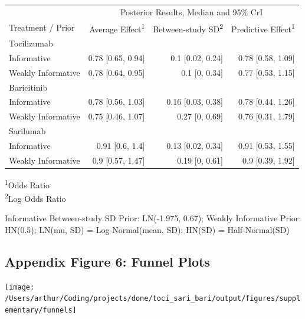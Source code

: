\documentclass[
  12pt,
]{article}
\begin{document}
\captionsetup[table]{labelformat=empty,skip=1pt}
\begin{longtable}{lrrr}
\toprule
 & \multicolumn{3}{c}{Posterior Results, Median and 95\% CrI} \\ 
 \cmidrule(lr){2-4}
Treatment / Prior & Average Effect\textsuperscript{1} & Between-study SD\textsuperscript{2} & Predictive Effect\textsuperscript{1} \\ 
\midrule
\multicolumn{1}{l}{Tocilizumab} \\ 
\midrule
Informative & 0.78 [0.65, 0.94] & 0.1 [0.02, 0.24] & 0.78 [0.58, 1.09] \\ 
Weakly Informative & 0.78 [0.64, 0.95] & 0.1 [0, 0.34] & 0.77 [0.53, 1.15] \\ 
\midrule
\multicolumn{1}{l}{Baricitinib} \\ 
\midrule
Informative & 0.78 [0.56, 1.03] & 0.16 [0.03, 0.38] & 0.78 [0.44, 1.26] \\ 
Weakly Informative & 0.75 [0.46, 1.07] & 0.27 [0, 0.69] & 0.76 [0.31, 1.79] \\ 
\midrule
\multicolumn{1}{l}{Sarilumab} \\ 
\midrule
Informative & 0.91 [0.6, 1.4] & 0.13 [0.02, 0.34] & 0.91 [0.53, 1.55] \\ 
Weakly Informative & 0.9 [0.57, 1.47] & 0.19 [0, 0.61] & 0.9 [0.39, 1.92] \\ 
 \bottomrule
\end{longtable}
\vspace{-5mm}
\begin{minipage}{\linewidth}
\textsuperscript{1}Odds Ratio \\ 
\textsuperscript{2}Log Odds Ratio \\ 
\end{minipage}
\begin{minipage}{\linewidth}
Informative Between-study SD Prior: LN(-1.975, 0.67); Weakly Informative Prior: HN(0.5); LN(mu, SD) = Log-Normal(mean, SD); HN(SD) = Half-Normal(SD)\\ 
\end{minipage}

\newpage

\hypertarget{appendix-figure-6-funnel-plots}{%
\subsection{Appendix Figure 6: Funnel
Plots}\label{appendix-figure-6-funnel-plots}}

\begin{center}\texttt{[image: /Users/arthur/Coding/projects/done/toci\_sari\_bari/output/figures/supplementary/funnels]} \end{center}
\end{document}
